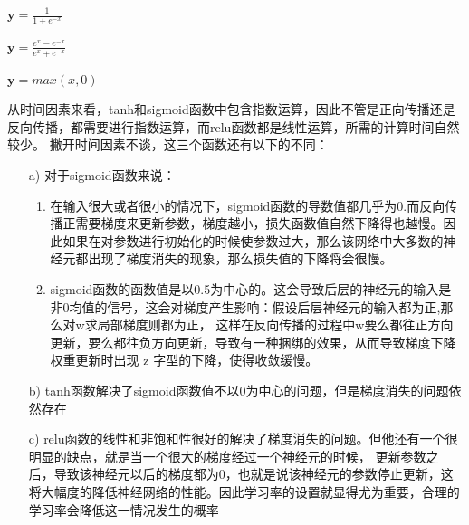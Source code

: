 \documentclass{article}
\begin{document}
\begin{minipage}[t]{0.3\linewidth}
\centering 
$\mathbf{y}=\frac{1}{1+e^{-x}}$
\end{minipage}%
\begin{minipage}[t]{0.3\linewidth} 
\centering 
$\mathbf{y}=\frac{e^x-e^{-x}}{e^x+e^{-x}}$
\end{minipage}%
\begin{minipage}[t]{0.3\linewidth} 
\centering 
$\mathbf{y}=max(x,0)$
\end{minipage}
\vspace{10pt}

从时间因素来看，tanh和sigmoid函数中包含指数运算，因此不管是正向传播还是
反向传播，都需要进行指数运算，而relu函数都是线性运算，所需的计算时间自然较少。
撇开时间因素不谈，这三个函数还有以下的不同：
\begin{itemize}
    \item[a)] 对于sigmoid函数来说：
    \begin{enumerate}
        \item 在输入很大或者很小的情况下，sigmoid函数的导数值都几乎为0.而反向传播正需要梯度来更新参数，梯度越小，损失函数值自然下降得也越慢。因此如果在对参数进行初始化的时候使参数过大，那么该网络中大多数的神经元都出现了梯度消失的现象，那么损失值的下降将会很慢。
        \item sigmoid函数的函数值是以0.5为中心的。这会导致后层的神经元的输入是非0均值的信号，这会对梯度产生影响：假设后层神经元的输入都为正,那么对w求局部梯度则都为正，
        这样在反向传播的过程中w要么都往正方向更新，要么都往负方向更新，导致有一种捆绑的效果，从而导致梯度下降权重更新时出现 z 字型的下降，使得收敛缓慢。
    \end{enumerate} 
    \item[b)] tanh函数解决了sigmoid函数值不以0为中心的问题，但是梯度消失的问题依然存在
    \item[c)] relu函数的线性和非饱和性很好的解决了梯度消失的问题。但他还有一个很明显的缺点，就是当一个很大的梯度经过一个神经元的时候，
    更新参数之后，导致该神经元以后的梯度都为0，也就是说该神经元的参数停止更新，这将大幅度的降低神经网络的性能。因此学习率的设置就显得尤为重要，合理的学习率会降低这一情况发生的概率 
\end{itemize}
\newpage
\end{document}
